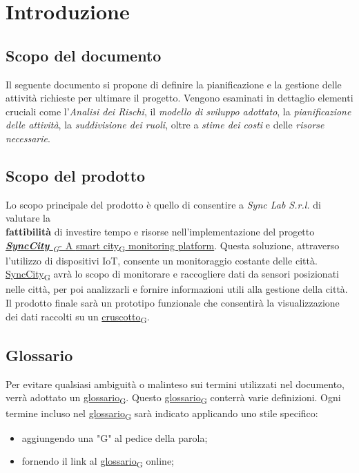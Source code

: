 \section{Introduzione}
\setcounter{subsection}{0}
\subsection{Scopo del documento}
Il seguente documento si propone di definire la pianificazione e la gestione delle attività richieste per ultimare il progetto. Vengono esaminati in dettaglio elementi cruciali come l’\textit{Analisi dei Rischi}, il \textit{modello di sviluppo adottato}, la \textit{pianificazione delle attività}, la \textit{suddivisione dei ruoli}, oltre a \textit{stime dei costi} e delle \textit{risorse necessarie}.

\subsection{Scopo del prodotto}
Lo scopo principale del prodotto è quello di consentire a \textit{Sync Lab S.r.l.} di valutare la \\\textbf{fattibilità} di investire tempo e risorse nell'implementazione del progetto  \href{https://7last.github.io/docs/rtb/documentazione-interna/glossario\#synccity}{\textit{\textbf{SyncCity} \textsubscript{G}}- A \href{https://7last.github.io/docs/rtb/documentazione-interna/glossario\#smart-city}{smart city\textsubscript{G}} monitoring platform}. Questa soluzione, attraverso l'utilizzo di dispositivi IoT, consente un monitoraggio costante delle città. \href{https://7last.github.io/docs/rtb/documentazione-interna/glossario\#synccity}{SyncCity\textsubscript{G}} avrà lo scopo di monitorare e raccogliere dati da sensori posizionati nelle città, per poi analizzarli e fornire informazioni utili alla gestione della città. Il prodotto finale sarà un prototipo funzionale che consentirà la visualizzazione dei dati raccolti su un \href{https://7last.github.io/docs/rtb/documentazione-interna/glossario\#cruscotto}{cruscotto\textsubscript{G}}.

\subsection{Glossario}
Per evitare qualsiasi ambiguità o malinteso sui termini utilizzati nel documento, verrà adottato un \href{https://7last.github.io/docs/rtb/documentazione-interna/glossario\#glossario}{glossario\textsubscript{G}}. Questo \href{https://7last.github.io/docs/rtb/documentazione-interna/glossario\#glossario}{glossario\textsubscript{G}} conterrà varie definizioni. Ogni termine incluso nel \href{https://7last.github.io/docs/rtb/documentazione-interna/glossario\#glossario}{glossario\textsubscript{G}} sarà indicato applicando uno stile specifico:
\begin{itemize}
    \item aggiungendo una "G" al pedice della parola;
    \item fornendo il link al \href{https://7last.github.io/docs/rtb/documentazione-interna/glossario\#glossario}{glossario\textsubscript{G}} online;
\end{itemize}

